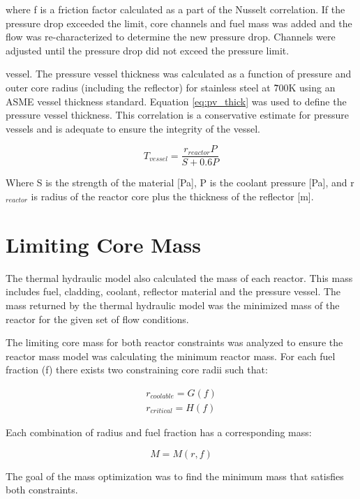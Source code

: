 where f is a friction factor calculated as a part of the Nusselt correlation. If the
pressure drop exceeded the limit, core channels and fuel mass was added and the
flow was re-characterized to determine the new pressure drop. Channels were adjusted
until the pressure drop did not exceed the pressure limit.

vessel. The pressure vessel thickness was calculated as a function of pressure
and outer core radius (including the reflector) for stainless steel at \~700K
using an ASME vessel thickness standard. Equation \ref{eq:pv_thick} was used to
define the pressure vessel thickness. This correlation is a conservative
estimate for pressure vessels and is adequate to ensure the integrity of the
vessel.

\begin{equation}
    T_{vessel} = \frac{r_{reactor}P}{S + 0.6P}
    \label{eq:pv_thick}
\end{equation}

Where S is the strength of the material [Pa], P is the coolant pressure [Pa],
and r$_{reactor}$ is radius of the reactor core plus the thickness of the
reflector [m].

\section{Limiting Core Mass}
The thermal hydraulic model also calculated the mass of each reactor. This
mass includes fuel, cladding, coolant, reflector material and the pressure
vessel. The mass returned by the thermal hydraulic model was the minimized mass
of the reactor for the given set of flow conditions.

The limiting core mass for both reactor constraints was analyzed to ensure the
reactor mass model was calculating the minimum reactor mass. For each fuel
fraction (f) there exists two constraining core radii such that:

\begin{align}
    r_{coolable} = G(f) \\
    r_{critical} = H(f)
\end{align}

Each combination of radius and fuel fraction has a corresponding mass:

\begin{equation}
    M = M(r, f)
\end{equation}

The goal of the mass optimization was to find the minimum mass that satisfies
both constraints.

